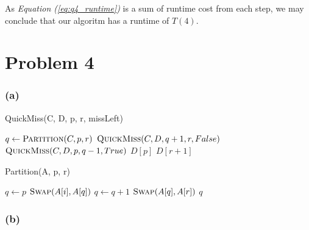 \documentclass[11pt]{article}
\begin{document}
As \textit{Equation (\ref{eq:q4_runtime})} is a sum of runtime cost from each step, we may conclude that our algoritm has a runtime of $T(4)$.

\newpage
\section{Problem 4}

\subsubsection{(a)}

\begin{algorithm}
\caption{QuickMiss(C, D, p, r, missLeft)}\label{QuickMiss}
    \begin{algorithmic}[1]
            \State $q \gets \textsc{Partition}(C, p, r)$
                \State \Return $\textsc{QuickMiss}(C, D, q+1, r, False)$
            \Else
                \State \Return $\textsc{QuickMiss}(C, D, p, q-1, True)$
            \EndIf
        \EndIf
            \State \Return $D[p]$
        \Else
            \State \Return $D[r+1]$
        \EndIf
        \EndProcedure
    \end{algorithmic}
\end{algorithm}


\begin{algorithm}
\caption{Partition(A, p, r)}\label{Partition}
    \begin{algorithmic}[1]
        \State $q \gets p$
                \State $\textsc{Swap}(A[i], A[q])$ 
                \State $q \gets q+1$
            \EndIf
        \EndFor
        \State $\textsc{Swap}(A[q], A[r])$
        \State \Return $q$
        \EndProcedure
    \end{algorithmic}
\end{algorithm}

\subsubsection{(b)}
\end{document}
